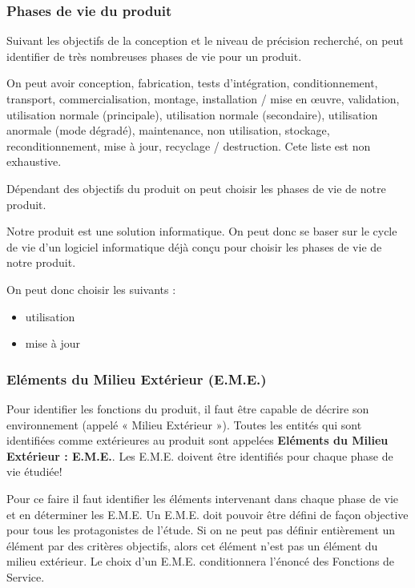 \subsubsection{Phases de vie du produit}
Suivant les objectifs de la conception et le niveau de précision recherché, on peut identifier
de très nombreuses phases de vie pour un produit.

On peut avoir conception, fabrication, tests d’intégration, conditionnement, transport, commercialisation, montage, installation / mise en œuvre, validation, utilisation normale (principale), utilisation normale (secondaire), utilisation anormale (mode dégradé), maintenance, non utilisation, stockage, reconditionnement, mise à jour, recyclage / destruction. Cete liste est non exhaustive.

Dépendant des objectifs du  produit on peut choisir les phases de vie de notre produit.

Notre produit est une solution informatique. On peut donc se baser sur le cycle de vie d'un logiciel informatique déjà conçu pour choisir les phases de vie de notre produit.

On peut donc choisir les suivants : 
\begin{itemize}
    \item utilisation
    \item mise à jour
\end{itemize}

\subsubsection{Eléments du Milieu Extérieur (E.M.E.)}
Pour identifier les fonctions du produit, il faut être capable de décrire son environnement (appelé « Milieu Extérieur »). Toutes les entités qui sont identifiées comme extérieures au produit
sont appelées \textbf{Eléments du Milieu Extérieur : E.M.E.}. Les E.M.E. doivent être identifiés pour chaque phase de vie étudiée!

Pour ce faire il faut identifier les éléments intervenant dans chaque phase de vie et en déterminer les E.M.E. Un E.M.E. doit pouvoir être défini de façon objective pour tous les protagonistes de l’étude. Si on ne peut pas définir entièrement un élément par des critères objectifs, alors cet élément n’est pas un élément du milieu extérieur. Le choix d’un E.M.E. conditionnera l’énoncé des Fonctions de Service.

